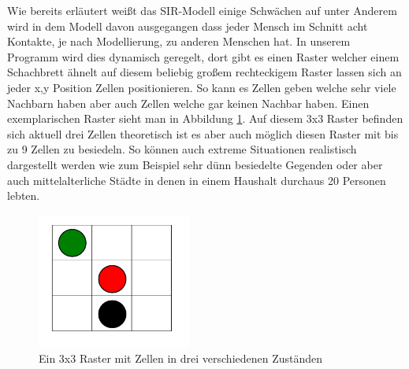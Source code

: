 Wie bereits erläutert weißt das SIR-Modell einige Schwächen auf unter Anderem wird in dem Modell davon ausgegangen dass jeder Mensch im Schnitt acht Kontakte, je nach Modellierung, zu anderen Menschen hat. In unserem Programm wird dies dynamisch geregelt, dort gibt es einen Raster welcher einem Schachbrett ähnelt auf diesem beliebig großem rechteckigem \glqq{}Raster\grqq{} lassen sich an jeder x,y Position Zellen positionieren. So kann es Zellen geben welche sehr viele Nachbarn haben aber auch Zellen welche gar keinen Nachbar haben. Einen exemplarischen Raster sieht man in  Abbildung \ref{fig:Raster}. Auf diesem 3x3 Raster befinden sich aktuell drei Zellen theoretisch ist es aber auch möglich diesen Raster mit bis zu 9 Zellen zu besiedeln. So können auch extreme Situationen realistisch dargestellt werden wie zum Beispiel sehr dünn besiedelte Gegenden oder aber auch mittelalterliche Städte in denen in einem Haushalt durchaus 20 Personen lebten.\\


\begin{figure}[t]
\centering
\includegraphics[width= 0.45\textwidth]{./images/nachbarn.png}
\caption{Ein 3x3 Raster mit Zellen in drei verschiedenen Zuständen}
\label{fig:Raster}
\end{figure}

